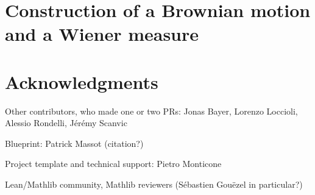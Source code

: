 \documentclass[lean]{Draft}
\begin{document}
\section{Construction of a Brownian motion and a Wiener measure}
\label{S:BM}


\section*{Acknowledgments}

Other contributors, who made one or two PRs: Jonas Bayer, Lorenzo Loccioli, Alessio Rondelli, Jérémy Scanvic

Blueprint: Patrick Massot (citation?)

Project template \cite{Monticone_LeanProject_2025} and technical support: Pietro Monticone

Lean/Mathlib community, Mathlib reviewers (Sébastien Gouëzel in particular?)


\printbibliography
\end{document}
